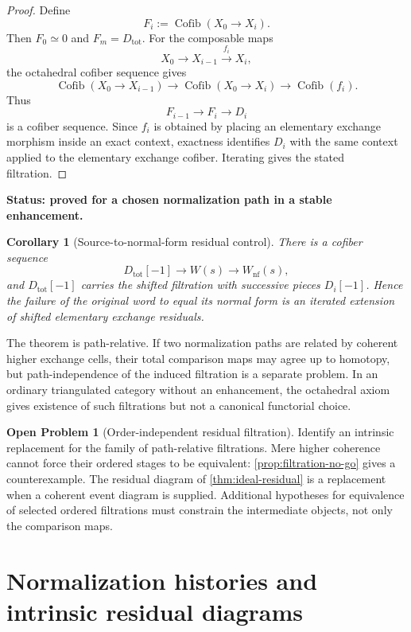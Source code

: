 \documentclass[11pt]{article}
\newtheorem{corollary}[theorem]{Corollary}
\theoremstyle{definition}
\newtheorem{problem}[theorem]{Open Problem}
\theoremstyle{remark}
\newcommand{\Cofib}{\operatorname{Cofib}}
\newcommand{\status}[1]{\textbf{Status: #1.}}
\begin{document}
\begin{proof}
Define
\[
F_i:=\Cofib(X_0\longrightarrow X_i).
\]
Then $F_0\simeq0$ and $F_m=D_{\mathrm{tot}}$. For the composable maps
\[
X_0\longrightarrow X_{i-1}\xrightarrow{f_i}X_i,
\]
the octahedral cofiber sequence gives
\[
\Cofib(X_0\to X_{i-1})
\longrightarrow
\Cofib(X_0\to X_i)
\longrightarrow
\Cofib(f_i).
\]
Thus
\[
F_{i-1}\longrightarrow F_i\longrightarrow D_i
\]
is a cofiber sequence. Since $f_i$ is obtained by placing an elementary exchange morphism inside an exact context, exactness identifies $D_i$ with the same context applied to the elementary exchange cofiber. Iterating gives the stated filtration.
\end{proof}

\status{proved for a chosen normalization path in a stable enhancement}

\begin{corollary}[Source-to-normal-form residual control]\label{cor:source-normal-control}
There is a cofiber sequence
\[
D_{\mathrm{tot}}[-1]\longrightarrow W(s)\longrightarrow W_{\mathrm{nf}}(s),
\]
and $D_{\mathrm{tot}}[-1]$ carries the shifted filtration with successive pieces $D_i[-1]$. Hence the failure of the original word to equal its normal form is an iterated extension of shifted elementary exchange residuals.
\end{corollary}

The theorem is path-relative. If two normalization paths are related by coherent higher exchange cells, their total comparison maps may agree up to homotopy, but path-independence of the induced filtration is a separate problem. In an ordinary triangulated category without an enhancement, the octahedral axiom gives existence of such filtrations but not a canonical functorial choice.

\begin{problem}[Order-independent residual filtration]\label{prob:path-independent}
Identify an intrinsic replacement for the family of path-relative filtrations. Mere higher coherence cannot force their ordered stages to be equivalent: \cref{prop:filtration-no-go} gives a counterexample. The residual diagram of \cref{thm:ideal-residual} is a replacement when a coherent event diagram is supplied. Additional hypotheses for equivalence of selected ordered filtrations must constrain the intermediate objects, not only the comparison maps.
\end{problem}

\section{Normalization histories and intrinsic residual diagrams}\label{sec:histories}
\end{document}
